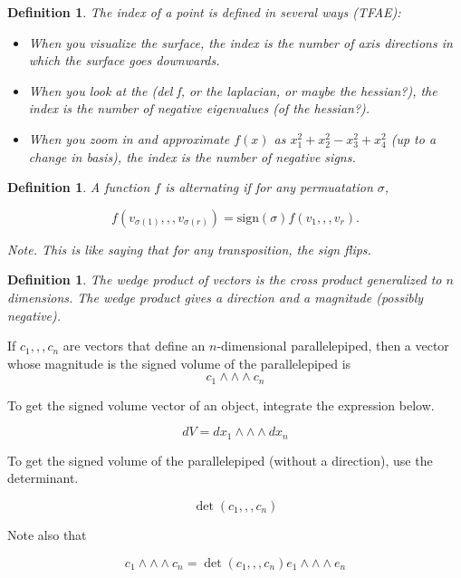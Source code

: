 \documentclass[11pt]{amsbook}
\newenvironment{dateenv}{
	\vspace{1em}
}{
	\vspace{1em}
}
\newcommand{\mydate}[4]{
	\newdate{#1}{#2}{#3}{#4}
	\begin{dateenv}
		\hfill\displaydate{#1}
	\end{dateenv}
}
\theoremstyle{mystyle} \newtheorem{thrm}[thm]{Theorem}
\theoremstyle{mystyle} \newtheorem{defi}[thm]{Definition}
\theoremstyle{mystyle} \newtheorem{coro}[thm]{Corollary}
\theoremstyle{mystyle} \newtheorem{propo}[thm]{Proposition}
\theoremstyle{mystyle} \newtheorem{lemm}[thm]{Lemma}
\numberwithin{thm}{section}
\newcommand{\sign}{\text{sign}}
\newcommand{\de}{\emph}
\begin{document}
\begin{defi}
	The \de{index} of a point is defined in several ways (TFAE):
	\begin{itemize}
		\item When you visualize the surface, the index is the number of axis directions in which the surface goes downwards.
		\item When you look at the (del f, or the laplacian, or maybe the hessian?), the index is the number of negative eigenvalues (of the hessian?).
		\item When you zoom in and approximate $f(x)$ as $x_1^2 + x_2^2 - x_3^2 + x_4^2$ (up to a change in basis), the index is the number of negative signs.
	\end{itemize}
\end{defi}

\mydate{d20}{5}{12}{2016}

\begin{defi}
	A function $f$ is \de{alternating} if for any permuatation $\sigma$,

	$$f(v_{\sigma(1)},,,v_{\sigma(r)}) = \sign(\sigma)f(v_1,,,v_r).$$

	Note.  This is like saying that for any transposition, the sign flips.
\end{defi}

\begin{defi}
	The \de{wedge product} of vectors is the cross product generalized to $n$ dimensions.  The wedge product gives a direction and a magnitude (possibly negative).
\end{defi}
\begin{example}
	If $c_1,,,c_n$ are vectors that define an $n$-dimensional parallelepiped, then a vector whose magnitude is the signed volume of the parallelepiped is $$c_1 \wedge\wedge\wedge c_n$$
\end{example}
\begin{example}
	To get the signed volume vector of an object, integrate the expression below.

	$$ dV = dx_1 \wedge\wedge\wedge dx_n$$
\end{example}
\begin{example}
	To get the signed volume of the parallelepiped (without a direction), use the determinant.

	$$\det(c_1,,,c_n)$$

	Note also that

	$$c_1 \wedge\wedge\wedge c_n = \det(c_1,,,c_n) e_1 \wedge\wedge\wedge e_n$$
\end{example}
\end{document}
